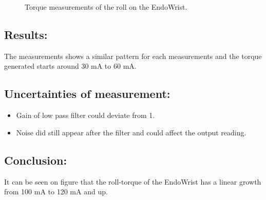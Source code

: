 \begin{figure}

\caption{Torque measurements of the roll on the EndoWrist.}
\label{fig_roll_mes}
\end{figure}




\subsection*{Results:}
The measurements shows a similar pattern for each measurements and the torque generated starts around 30 mA to 60 mA. 



%

\subsection*{Uncertainties of measurement:}
\begin{itemize}
\item Gain of low pass filter could deviate from 1.
\item Noise did still appear after the filter and could affect the output reading.
\end{itemize}

\subsection*{Conclusion:}
It can be seen on figure  that the roll-torque of the EndoWrist has a linear growth from 100 mA to 120 mA and up.

